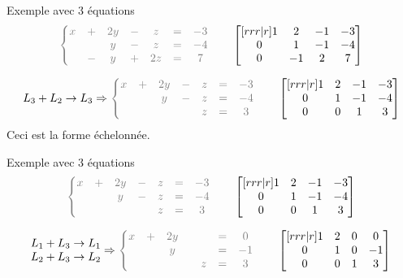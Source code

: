 \documentclass[french]{beamer}
\begin{document}
\begin{frame}{Exemple avec 3 équations}
\[\color{gray}
\left\{
	\begin{matrix}
	x &+& 2y &-& z &=& -3\\
	&& y &-& z &=& -4\\
	&-& y &+& 2z &=& 7
	\end{matrix}\right.
	\qquad\color{black}
	\begin{bmatrix}[rrr|r]
1 & 2 & -1 & -3 \\
0 & 1 & -1 & -4 \\
0 & -1 & 2 & 7
\end{bmatrix}
\color{black}
\]

\[
L_3 + L_2 \rightarrow L_3 \Rightarrow
\color{gray}
\left\{
	\begin{matrix}
	x &+& 2y &-& z &=& -3\\
	&& y &-& z &=& -4\\
	&&  && z &=& 3
	\end{matrix}\right.
	\qquad\color{black}
	\begin{bmatrix}[rrr|r]
1 & 2 & -1 & -3 \\
0 & 1 & -1 & -4 \\
0 & 0 & 1 & 3
\end{bmatrix}
\]
Ceci est la forme échelonnée.
\end{frame}

\begin{frame}{Exemple avec 3 équations}
\[\color{gray}
\left\{
	\begin{matrix}
	x &+& 2y &-& z &=& -3\\
	&& y &-& z &=& -4\\
	&&  && z &=& 3
	\end{matrix}\right.
	\qquad\color{black}
	\begin{bmatrix}[rrr|r]
1 & 2 & -1 & -3 \\
0 & 1 & -1 & -4 \\
0 & 0 & 1 & 3
\end{bmatrix}
\color{black}
\]

\[
		\begin{matrix}
		L_1 + L_3 \rightarrow L_1\\
		L_2 + L_3 \rightarrow L_2\\
		\end{matrix}
 \Rightarrow
\color{gray}
\left\{
	\begin{matrix}
		x &+& 2y && &=& 0\\
		 && y && &=& -1\\
		 &&  && z &=& 3
	\end{matrix}\right.
	\qquad\color{black}
	\begin{bmatrix}[rrr|r]
        1 & 2 & 0 & 0 \\
        0 & 1 & 0 & -1 \\
        0 & 0 & 1 & 3
\end{bmatrix}
\]
\end{frame}
\end{document}

